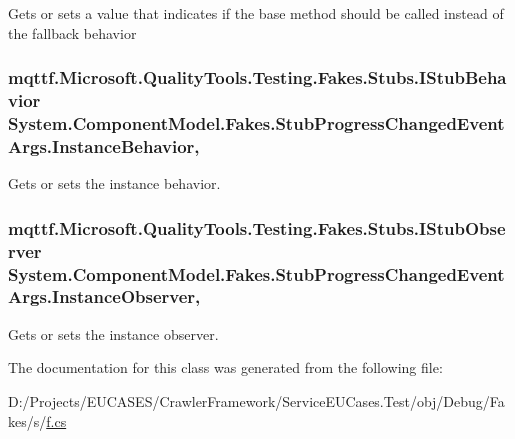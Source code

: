 Gets or sets a value that indicates if the base method should be called instead of the fallback behavior

\hypertarget{class_system_1_1_component_model_1_1_fakes_1_1_stub_progress_changed_event_args_a7cfc4ffb35ad494ea1b99b47d99fa0e4}{
\subsubsection[{Instance\-Behavior}]{\setlength{\rightskip}{0pt plus 5cm}mqttf.\-Microsoft.\-Quality\-Tools.\-Testing.\-Fakes.\-Stubs.\-I\-Stub\-Behavior System.\-Component\-Model.\-Fakes.\-Stub\-Progress\-Changed\-Event\-Args.\-Instance\-Behavior\hspace{0.3cm}{\ttfamily [get]}, {\ttfamily [set]}}}\label{class_system_1_1_component_model_1_1_fakes_1_1_stub_progress_changed_event_args_a7cfc4ffb35ad494ea1b99b47d99fa0e4}


Gets or sets the instance behavior.

\hypertarget{class_system_1_1_component_model_1_1_fakes_1_1_stub_progress_changed_event_args_a78aded7177cb8a3756d322af6e3094a3}{
\subsubsection[{Instance\-Observer}]{\setlength{\rightskip}{0pt plus 5cm}mqttf.\-Microsoft.\-Quality\-Tools.\-Testing.\-Fakes.\-Stubs.\-I\-Stub\-Observer System.\-Component\-Model.\-Fakes.\-Stub\-Progress\-Changed\-Event\-Args.\-Instance\-Observer\hspace{0.3cm}{\ttfamily [get]}, {\ttfamily [set]}}}\label{class_system_1_1_component_model_1_1_fakes_1_1_stub_progress_changed_event_args_a78aded7177cb8a3756d322af6e3094a3}


Gets or sets the instance observer.



The documentation for this class was generated from the following file\-:\begin{DoxyCompactItemize}
\item 
D\-:/\-Projects/\-E\-U\-C\-A\-S\-E\-S/\-Crawler\-Framework/\-Service\-E\-U\-Cases.\-Test/obj/\-Debug/\-Fakes/s/\hyperlink{s_2f_8cs}{f.\-cs}\end{DoxyCompactItemize}
